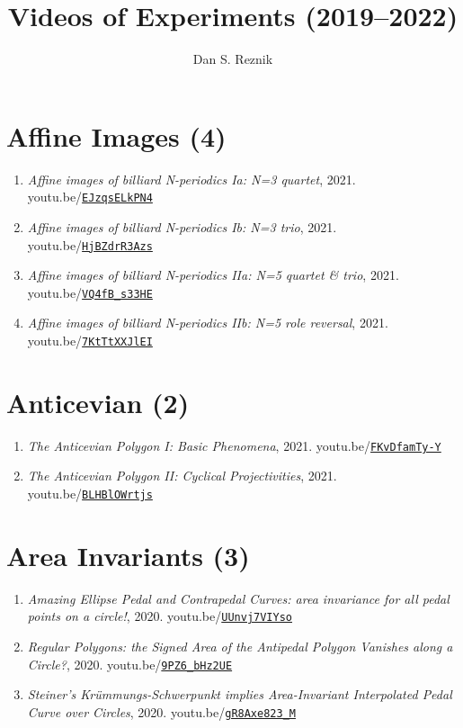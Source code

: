\documentclass[12pt]{article}
\title{Videos of Experiments (2019--2022)}
\author{Dan S. Reznik}
\begin{document}
\maketitle

\tableofcontents\section{Affine Images (4)}

\begin{enumerate}[resume]
\item \textit{Affine images of billiard N-periodics Ia: N=3 quartet}, 2021. youtu.be/\href{https://youtu.be/EJzqsELkPN4}{\nolinkurl{EJzqsELkPN4}}
\item \textit{Affine images of billiard N-periodics Ib: N=3 trio}, 2021. youtu.be/\href{https://youtu.be/HjBZdrR3Azs}{\nolinkurl{HjBZdrR3Azs}}
\item \textit{Affine images of billiard N-periodics IIa: N=5 quartet \& trio}, 2021. youtu.be/\href{https://youtu.be/VQ4fB_s33HE}{\nolinkurl{VQ4fB\_s33HE}}
\item \textit{Affine images of billiard N-periodics IIb: N=5 role reversal}, 2021. youtu.be/\href{https://youtu.be/7KtTtXXJlEI}{\nolinkurl{7KtTtXXJlEI}}
\end{enumerate}

\section{Anticevian (2)}

\begin{enumerate}[resume]
\item \textit{The Anticevian Polygon I: Basic Phenomena}, 2021. youtu.be/\href{https://youtu.be/FKvDfamTy-Y}{\nolinkurl{FKvDfamTy-Y}}
\item \textit{The Anticevian Polygon II: Cyclical Projectivities}, 2021. youtu.be/\href{https://youtu.be/BLHBlOWrtjs}{\nolinkurl{BLHBlOWrtjs}}
\end{enumerate}

\section{Area Invariants (3)}

\begin{enumerate}[resume]
\item \textit{Amazing Ellipse Pedal and Contrapedal Curves: area invariance for all pedal points on a circle!}, 2020. youtu.be/\href{https://youtu.be/UUnvj7VIYso}{\nolinkurl{UUnvj7VIYso}}
\item \textit{Regular Polygons: the Signed Area of the Antipedal Polygon Vanishes along a Circle?}, 2020. youtu.be/\href{https://youtu.be/9PZ6_bHz2UE}{\nolinkurl{9PZ6\_bHz2UE}}
\item \textit{Steiner's Krümmungs-Schwerpunkt implies Area-Invariant Interpolated Pedal Curve over Circles}, 2020. youtu.be/\href{https://youtu.be/gR8Axe823_M}{\nolinkurl{gR8Axe823\_M}}
\end{enumerate}
\end{document}
